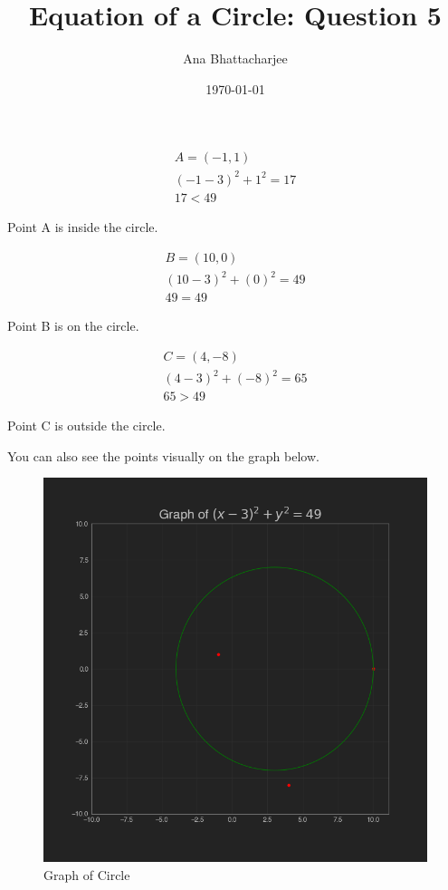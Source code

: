 \documentclass{article}
\begin{document}
\author{Ana Bhattacharjee}
\title{Equation of a Circle: Question 5}
\date{\today}
\maketitle{}

\begin{center}
  \begin{align}
    A = (-1, 1) \\
    (-1 - 3)^2 + 1^2 = 17 \\
    17 < 49
  \end{align}
  \par
  Point A is inside the circle.
  \par
  \begin{align}
    B = (10, 0) \\
    (10 - 3)^2 + (0)^2 = 49 \\
    49 = 49
  \end{align}
  \par
  Point B is on the circle.
  \par
  \begin{align}
    C = (4, -8) \\
    (4 - 3)^2 + (-8)^2 = 65 \\
    65 > 49
  \end{align}
  \par
  Point C is outside the circle.
\end{center}
You can also see the points visually on the graph below. 
\begin{figure}
  \includegraphics[width=1.2\columnwidth]{../../../../../../math/anna/geometry/coordinate_geometry/circles/q5/graph.png}
  \caption{Graph of Circle}
\end{figure}
\end{document}
